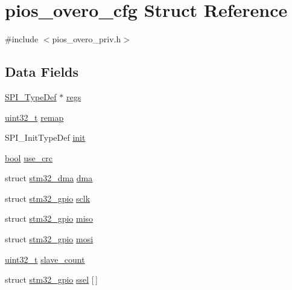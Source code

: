 \hypertarget{structpios__overo__cfg}{\section{pios\-\_\-overo\-\_\-cfg Struct Reference}
\label{structpios__overo__cfg}
}


{\ttfamily \#include $<$pios\-\_\-overo\-\_\-priv.\-h$>$}

\subsection*{Data Fields}
\begin{DoxyCompactItemize}
\item 
\hyperlink{struct_s_p_i___type_def}{S\-P\-I\-\_\-\-Type\-Def} $\ast$ \hyperlink{structpios__overo__cfg_ad650bcb134b4b4c297048d8747734b54}{regs}
\item 
\hyperlink{stdint_8h_a435d1572bf3f880d55459d9805097f62}{uint32\-\_\-t} \hyperlink{structpios__overo__cfg_a4e5e4acb1ac26af5b7938d2e41387f2d}{remap}
\item 
S\-P\-I\-\_\-\-Init\-Type\-Def \hyperlink{structpios__overo__cfg_a7eab710432a7a408f6bc9312e5d12e24}{init}
\item 
\hyperlink{group___exported__types_gaf6a258d8f3ee5206d682d799316314b1}{bool} \hyperlink{structpios__overo__cfg_afee45313c7db22563bb644ca87b79bac}{use\-\_\-crc}
\item 
struct \hyperlink{structstm32__dma}{stm32\-\_\-dma} \hyperlink{structpios__overo__cfg_a16a7dbb7388c47c8b5479da68176de6c}{dma}
\item 
struct \hyperlink{structstm32__gpio}{stm32\-\_\-gpio} \hyperlink{structpios__overo__cfg_a5d9ae103e82aa3ea8845e181dd76f19f}{sclk}
\item 
struct \hyperlink{structstm32__gpio}{stm32\-\_\-gpio} \hyperlink{structpios__overo__cfg_a4f182bb3911f41c5e505ed81e688c343}{miso}
\item 
struct \hyperlink{structstm32__gpio}{stm32\-\_\-gpio} \hyperlink{structpios__overo__cfg_a5aea93e3a5fcc6249bad26a9ffcccc8a}{mosi}
\item 
\hyperlink{stdint_8h_a435d1572bf3f880d55459d9805097f62}{uint32\-\_\-t} \hyperlink{structpios__overo__cfg_a77972607cc3846ca93052fa2e4efdce3}{slave\-\_\-count}
\item 
struct \hyperlink{structstm32__gpio}{stm32\-\_\-gpio} \hyperlink{structpios__overo__cfg_a900adf7a473ee816fb7044425cabd0de}{ssel} \mbox{[}$\,$\mbox{]}
\end{DoxyCompactItemize}


